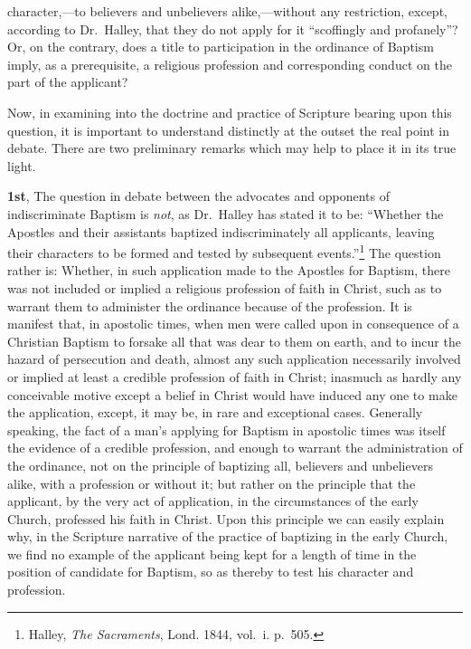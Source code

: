 \documentclass[
  english,
]{book}
\begin{document}
character,---to believers and unbelievers alike,---without any restriction, except, according to Dr.~Halley, that they do not apply for it ``scoffingly and profanely''? Or, on the contrary, does a title to participation in the ordinance of Baptism imply, as a prerequisite, a religious profession and corresponding conduct on the part of the applicant?

Now, in examining into the doctrine and practice of Scripture bearing upon this question, it is important to understand distinctly at the outset the real point in debate. There are two preliminary remarks which may help to place it in its true light.

\textbf{1st}, The question in debate between the advocates and opponents of indiscriminate Baptism is \emph{not}, as Dr.~Halley has stated it to be: ``Whether the Apostles and their assistants baptized indiscriminately all applicants, leaving their characters to be formed and tested by subsequent events.''\footnote{Halley, \emph{The Sacraments}, Lond. 1844, vol.~i. p.~505.} The question rather is: Whether, in such application made to the Apostles for Baptism, there was not included or implied a religious profession of faith in Christ, such as to warrant them to administer the ordinance because of the profession. It is manifest that, in apostolic times, when men were called upon in consequence of a Christian Baptism to forsake all that was dear to them on earth, and to incur the hazard of persecution and death, almost any such application necessarily involved or implied at least a credible profession of faith in Christ; inasmuch as hardly any conceivable motive except a belief in Christ would have induced any one to make the application, except, it may be, in rare and exceptional cases. Generally speaking, the fact of a man's applying for Baptism in apostolic times was itself the evidence of a credible profession, and enough to warrant the administration of the ordinance, not on the principle of baptizing all, believers and unbelievers alike, with a profession or without it; but rather on the principle that the applicant, by the very act of application, in the circumstances of the early Church, professed his faith in Christ. Upon this principle we can easily explain why, in the Scripture narrative of the practice of baptizing in the early Church, we find no example of the applicant being kept for a length of time in the position of candidate for Baptism, so as thereby to test his character and profession.
\end{document}
